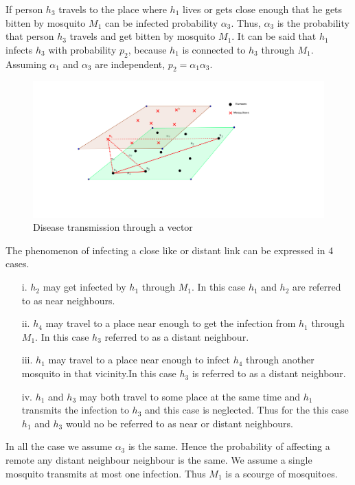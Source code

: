  If person $h_3$ travels to the place where $h_1$ lives or gets close enough that he gets bitten by mosquito $M_1$ can be infected probability $\alpha_3$. Thus, $\alpha_3$ is the probability that person $h_3$ travels and get bitten by mosquito $M_1$. It can be said that $h_1$ infects $h_3$ with probability $p_2$, because $h_1$ is connected to $h_3$ through $M_1$. Assuming $\alpha_1$ and $\alpha_3$ are independent, $p_2 = \alpha_1 \alpha_3$.
\begin{figure}[h!]
\centering
\includegraphics[scale=1]{images/human_mosquito.png}
\caption{Disease transmission through a vector} \label{fig5}
\end{figure}
The phenomenon of infecting a close like  or distant link can be expressed in 4 cases.


\begin{itemize}
\item[i.] $h_2$ may get infected by $h_1$ through $M_1$. In this case $h_1$ and $h_2$ are referred to as near neighbours.
\item[ii.] $h_4$ may travel to a place near enough to get the infection from $h_1$ through $M_1$. In this case $h_3$  referred to as a distant neighbour.
\item[iii.] $ h_1$ may travel to a place near enough to infect $h_4$  through another mosquito in that vicinity.In this case $h_3$ is  referred to as a distant neighbour.
\item[iv.] $h_1$  and $h_3$ may both travel to some place at the same time and $h_1$ transmits the infection to $h_3$ and this case is neglected. Thus for the this case $h_1$ and $h_3$ would no be referred to as near or distant neighbours.
\end{itemize}

In all the case we assume $\alpha_3$ is the same. Hence the probability of affecting a remote any distant neighbour neighbour is the same. We assume a single mosquito transmits at most   one infection. Thus $M_1$ is a scourge of mosquitoes.

